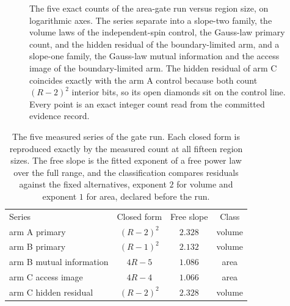 \documentclass[aps,pre,reprint,nofootinbib]{revtex4-2}
\begin{document}
\begin{figure}[t]
\centering
{}
\caption{The five exact counts of the area-gate run versus region size,
on logarithmic axes.  The series separate into a slope-two family, the
volume laws of the independent-spin control, the Gauss-law primary count,
and the hidden residual of the boundary-limited arm, and a slope-one
family, the Gauss-law mutual information and the access image of the
boundary-limited arm.  The hidden residual of arm C coincides exactly
with the arm A control because both count $(R-2)^2$ interior bits, so its
open diamonds sit on the control line.  Every point is an exact integer
count read from the committed evidence record.}
\label{fig:counts}
\end{figure}

\begin{table}[t]
\caption{The five measured series of the gate run.  Each closed form is
reproduced exactly by the measured count at all fifteen region sizes.
The free slope is the fitted exponent of a free power law over the full
range, and the classification compares residuals against the fixed
alternatives, exponent $2$ for volume and exponent $1$ for area, declared
before the run.}
\label{tab:fits}
\begin{ruledtabular}
\begin{tabular}{lccc}
Series & Closed form & Free slope & Class \\
\colrule
arm A primary            & $(R-2)^2$ & $2.328$ & volume \\
arm B primary            & $(R-1)^2$ & $2.132$ & volume \\
arm B mutual information & $4R-5$    & $1.086$ & area   \\
arm C access image       & $4R-4$    & $1.066$ & area   \\
arm C hidden residual    & $(R-2)^2$ & $2.328$ & volume \\
\end{tabular}
\end{ruledtabular}
\end{table}
\end{document}
